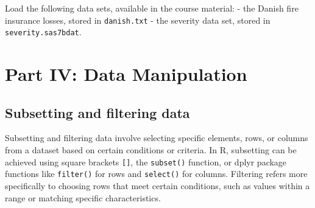\documentclass[
]{book}
\newenvironment{Shaded}{\begin{snugshade}}{\end{snugshade}}
\newcommand{\AttributeTok}[1]{\textcolor[rgb]{0.13,0.29,0.53}{#1}}
\newcommand{\CommentTok}[1]{\textcolor[rgb]{0.56,0.35,0.01}{\textit{#1}}}
\newcommand{\DecValTok}[1]{\textcolor[rgb]{0.00,0.00,0.81}{#1}}
\newcommand{\FunctionTok}[1]{\textcolor[rgb]{0.13,0.29,0.53}{\textbf{#1}}}
\newcommand{\NormalTok}[1]{#1}
\newcommand{\OtherTok}[1]{\textcolor[rgb]{0.56,0.35,0.01}{#1}}
\newcommand{\SpecialCharTok}[1]{\textcolor[rgb]{0.81,0.36,0.00}{\textbf{#1}}}
\newcommand{\StringTok}[1]{\textcolor[rgb]{0.31,0.60,0.02}{#1}}
\begin{document}
Load the following data sets, available in the course material:
- the Danish fire insurance losses, stored in \texttt{danish.txt}
- the severity data set, stored in \texttt{severity.sas7bdat}.

\chapter*{Part IV: Data Manipulation}\label{part-iv-data-manipulation}

\section*{Subsetting and filtering data}\label{subsetting-and-filtering-data}

Subsetting and filtering data involve selecting specific elements, rows, or columns from a dataset based on certain conditions or criteria. In R, subsetting can be achieved using square brackets \texttt{{[}{]}}, the \texttt{subset()} function, or dplyr package functions like \texttt{filter()} for rows and \texttt{select()} for columns. Filtering refers more specifically to choosing rows that meet certain conditions, such as values within a range or matching specific characteristics.

\begin{Shaded}
\end{Shaded}
\end{document}

